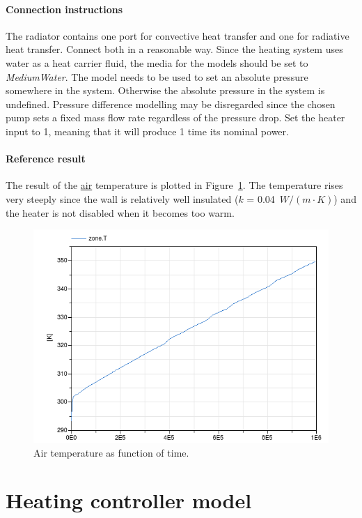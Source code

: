 \documentclass[10pt,a4paper]{article}
\begin{document}
\paragraph{Connection instructions}
The radiator contains one port for convective 
heat transfer and one for radiative heat transfer.
Connect both in a reasonable way.
Since the heating system uses water as a heat carrier fluid, 
the media for the models should be set to \textit{MediumWater}.
The  model needs to be used to set an absolute
pressure somewhere in the system. 
Otherwise the absolute 
pressure in the system is undefined.
Pressure difference modelling may be disregarded since the chosen pump
sets a fixed mass flow rate regardless of the pressure drop.
Set the heater input to 1, meaning that it will
produce 1 time its nominal power.

\paragraph{Reference result}
The result of the \underline{air} temperature 
is plotted in Figure~\ref{fig:res4}.
The temperature rises very steeply since the 
wall is relatively well insulated ($k$ = 0.04~$W/(m\cdot K)$)
and the heater is not disabled when it becomes too warm.

\begin{figure}[h!]
\centering
\includegraphics[scale=0.6]{result4.png}
\caption{Air temperature as function of time.}
\label{fig:res4}
\end{figure}

\newpage

\section{Heating controller model}
\end{document}
